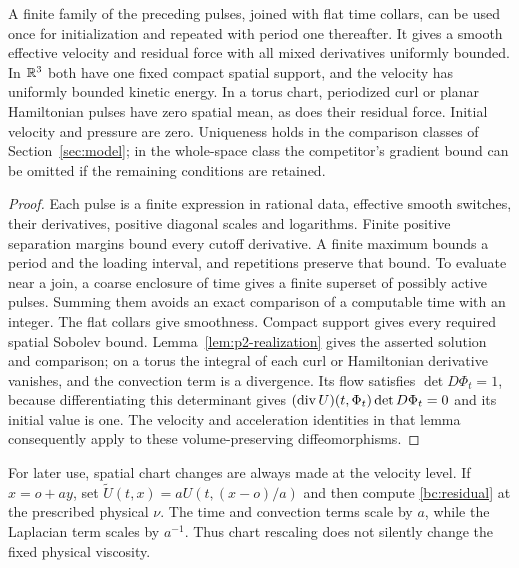 \begin{lemma}\label{bc:analytic}
A finite family of the preceding pulses, joined with flat time collars,
can be used once for initialization and repeated with period one thereafter.
It gives a smooth effective velocity and residual force with all mixed
derivatives uniformly bounded. In $\mathbb R^3$ both have one fixed compact
spatial support, and the velocity has uniformly bounded kinetic energy.
In a torus chart,
periodized curl or planar Hamiltonian pulses have zero spatial mean, as
does their residual force. Initial velocity and pressure are zero.
Uniqueness holds in the comparison classes of Section~\ref{sec:model};
in the whole-space class the competitor's gradient bound can be omitted
if the remaining conditions are retained.
\end{lemma}
\begin{proof}\label{bc:analytic-proof}
Each pulse is a finite expression in rational data, effective smooth
switches, their derivatives, positive diagonal scales and logarithms.
Finite positive separation margins bound every cutoff derivative. A finite
maximum bounds a period and the loading interval, and repetitions preserve
that bound. To evaluate near a join, a coarse enclosure of time gives a
finite superset of possibly active pulses. Summing them avoids an exact
comparison of a computable time with an integer. The flat collars give
smoothness. Compact support gives every required spatial Sobolev bound.
Lemma~\ref{lem:p2-realization} gives the asserted solution and comparison;
on a torus the integral of each curl or Hamiltonian derivative vanishes,
and the convection term is a divergence. Its flow satisfies
$\det D\Phi_t=1$, because differentiating this determinant gives
$(\operatorname{div} U)(t,\Phi_t)\det D\Phi_t=0$ and its initial value is one.
The velocity and acceleration identities in that lemma consequently apply
to these volume-preserving diffeomorphisms.
\end{proof}

For later use, spatial chart changes are always made at the velocity level.
If $x=o+a y$, set $\widetilde U(t,x)=aU(t,(x-o)/a)$ and then compute
\eqref{bc:residual} at the prescribed physical $\nu$. The time and convection
terms scale by $a$, while the Laplacian term scales by $a^{-1}$.
Thus chart rescaling does not silently change the fixed physical viscosity.
